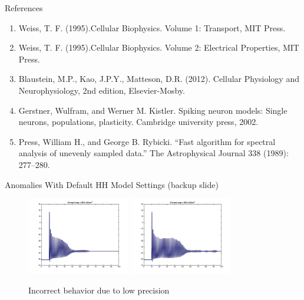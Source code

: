 \documentclass{beamer}
\begin{document}
\begin{frame}{References}
\begin{enumerate}
\item Weiss, T. F. (1995).Cellular Biophysics. Volume 1: Transport, MIT Press.
\item Weiss, T. F. (1995).Cellular Biophysics. Volume 2: Electrical Properties, MIT Press.
\item Blaustein, M.P., Kao, J.P.Y., Matteson, D.R. (2012). Cellular Physiology and Neurophysiology, 2nd edition, Elsevier-Mosby.
\item Gerstner, Wulfram, and Werner M. Kistler. Spiking neuron models: Single neurons, populations, plasticity. Cambridge university press, 2002.
\item Press, William H., and George B. Rybicki. ``Fast algorithm for spectral analysis of unevenly sampled data.'' The Astrophysical Journal 338 (1989): 277--280.
\end{enumerate}
\end{frame}

\begin{frame}{Anomalies With Default HH Model Settings (backup slide)}
  \begin{figure}
    \centering
    \includegraphics[width = 0.4\textwidth]{./images/current55p5.jpg}
    \includegraphics[width = 0.4\textwidth]{./images/current55p6.jpg}

    Incorrect behavior due to low precision
  \end{figure}
\end{frame}
\end{document}
